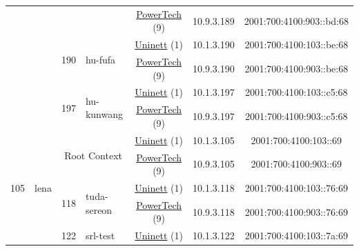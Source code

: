 \begin{small}
\begin{center}
\begin{longtable}{|c|c|c|c|c|c|c|c|}
  &  &  &  & \multicolumn{2}{|c|}{\tiny{\href{http://www.powertech.no}{PowerTech} (9)}} & \tiny{10.9.3.189} & \tiny{2001:700:4100:903::bd:68} \\* \cline{3-3}\cline{4-4}\cline{5-5}\cline{6-6}\cline{7-7}\cline{8-8}
  &  & \multirow{2}{*}{\tiny{190}} & \multicolumn{1}{|l|}{\multirow{2}{*}{\tiny{hu-fufa}}} & \multicolumn{2}{|c|}{\tiny{\href{https://www.uninett.no}{Uninett} (1)}} & \tiny{10.1.3.190} & \tiny{2001:700:4100:103::be:68} \\* \cline{5-5}\cline{6-6}\cline{7-7}\cline{8-8}
  &  &  &  & \multicolumn{2}{|c|}{\tiny{\href{http://www.powertech.no}{PowerTech} (9)}} & \tiny{10.9.3.190} & \tiny{2001:700:4100:903::be:68} \\* \cline{3-3}\cline{4-4}\cline{5-5}\cline{6-6}\cline{7-7}\cline{8-8}
  &  & \multirow{2}{*}{\tiny{197}} & \multicolumn{1}{|l|}{\multirow{2}{*}{\tiny{hu-kunwang}}} & \multicolumn{2}{|c|}{\tiny{\href{https://www.uninett.no}{Uninett} (1)}} & \tiny{10.1.3.197} & \tiny{2001:700:4100:103::c5:68} \\* \cline{5-5}\cline{6-6}\cline{7-7}\cline{8-8}
  &  &  &  & \multicolumn{2}{|c|}{\tiny{\href{http://www.powertech.no}{PowerTech} (9)}} & \tiny{10.9.3.197} & \tiny{2001:700:4100:903::c5:68} \\ \hline
 \multirow{20}{*}{\tiny{105}} & \multicolumn{1}{|l|}{\multirow{20}{*}{\tiny{lena}}} & \multicolumn{2}{|c|}{\multirow{2}{*}{\tiny{Root Context}}} & \multicolumn{2}{|c|}{\tiny{\href{https://www.uninett.no}{Uninett} (1)}} & \tiny{10.1.3.105} & \tiny{2001:700:4100:103::69} \\* \cline{5-5}\cline{6-6}\cline{7-7}\cline{8-8}
  &  & \multicolumn{2}{|c|}{} & \multicolumn{2}{|c|}{\tiny{\href{http://www.powertech.no}{PowerTech} (9)}} & \tiny{10.9.3.105} & \tiny{2001:700:4100:903::69} \\* \cline{3-3}\cline{4-4}\cline{5-5}\cline{6-6}\cline{7-7}\cline{8-8}
  &  & \multirow{2}{*}{\tiny{118}} & \multicolumn{1}{|l|}{\multirow{2}{*}{\tiny{tuda-sereon}}} & \multicolumn{2}{|c|}{\tiny{\href{https://www.uninett.no}{Uninett} (1)}} & \tiny{10.1.3.118} & \tiny{2001:700:4100:103::76:69} \\* \cline{5-5}\cline{6-6}\cline{7-7}\cline{8-8}
  &  &  &  & \multicolumn{2}{|c|}{\tiny{\href{http://www.powertech.no}{PowerTech} (9)}} & \tiny{10.9.3.118} & \tiny{2001:700:4100:903::76:69} \\* \cline{3-3}\cline{4-4}\cline{5-5}\cline{6-6}\cline{7-7}\cline{8-8}
  &  & \multirow{2}{*}{\tiny{122}} & \multicolumn{1}{|l|}{\multirow{2}{*}{\tiny{srl-test}}} & \multicolumn{2}{|c|}{\tiny{\href{https://www.uninett.no}{Uninett} (1)}} & \tiny{10.1.3.122} & \tiny{2001:700:4100:103::7a:69} \\* \cline{5-5}\cline{6-6}\cline{7-7}\cline{8-8}

\end{longtable}
\end{center}
\end{small}
